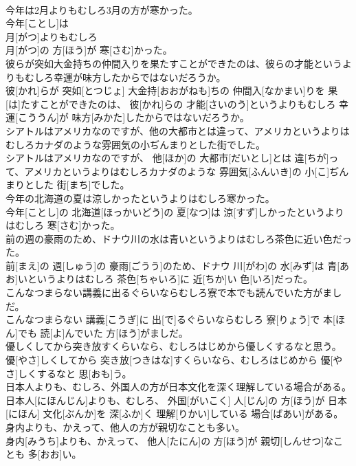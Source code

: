 \documentclass[8pt]{extreport}
\begin{document}
\begin{CJK}{UTF8}{min}
\\	今年は2月よりもむしろ3月の方が寒かった。	
\\	今年[ことし]は 
\\	月[がつ]よりもむしろ 
\\	月[がつ]の 方[ほう]が 寒[さむ]かった。
\\	彼らが突如大金持ちの仲間入りを果たすことができたのは、彼らの才能というよりもむしろ幸運が味方したからではないだろうか。	
\\	彼[かれ]らが 突如[とつじょ] 大金持[おおがねも]ちの 仲間入[なかまい]りを 果[は]たすことができたのは、 彼[かれ]らの 才能[さいのう]というよりもむしろ 幸運[こううん]が 味方[みかた]したからではないだろうか。
\\	シアトルはアメリカなのですが、他の大都市とは違って、アメリカというよりはむしろカナダのような雰囲気の小ぢんまりとした街でした。	
\\	シアトルはアメリカなのですが、 他[ほか]の 大都市[だいとし]とは 違[ちが]って、アメリカというよりはむしろカナダのような 雰囲気[ふんいき]の 小[こ]ぢんまりとした 街[まち]でした。
\\	今年の北海道の夏は涼しかったというよりはむしろ寒かった。	
\\	今年[ことし]の 北海道[ほっかいどう]の 夏[なつ]は 涼[すず]しかったというよりはむしろ 寒[さむ]かった。
\\	前の週の豪雨のため、ドナウ川の水は青いというよりはむしろ茶色に近い色だった。	
\\	前[まえ]の 週[しゅう]の 豪雨[ごうう]のため、ドナウ 川[がわ]の 水[みず]は 青[あお]いというよりはむしろ 茶色[ちゃいろ]に 近[ちか]い 色[いろ]だった。
\\	こんなつまらない講義に出るぐらいならむしろ寮で本でも読んでいた方がましだ。	
\\	こんなつまらない 講義[こうぎ]に 出[で]るぐらいならむしろ 寮[りょう]で 本[ほん]でも 読[よ]んでいた 方[ほう]がましだ。
\\	優しくしてから突き放すくらいなら、むしろはじめから優しくするなと思う。	
\\	優[やさ]しくしてから 突き放[つきはな]すくらいなら、むしろはじめから 優[やさ]しくするなと 思[おも]う。
\\	日本人よりも、むしろ、外国人の方が日本文化を深く理解している場合がある。	
\\	日本人[にほんじん]よりも、むしろ、 外国[がいこく] 人[じん]の 方[ほう]が 日本[にほん] 文化[ぶんか]を 深[ふか]く 理解[りかい]している 場合[ばあい]がある。
\\	身内よりも、かえって、他人の方が親切なことも多い。	
\\	身内[みうち]よりも、かえって、 他人[たにん]の 方[ほう]が 親切[しんせつ]なことも 多[おお]い。

\end{CJK}
\end{document}
